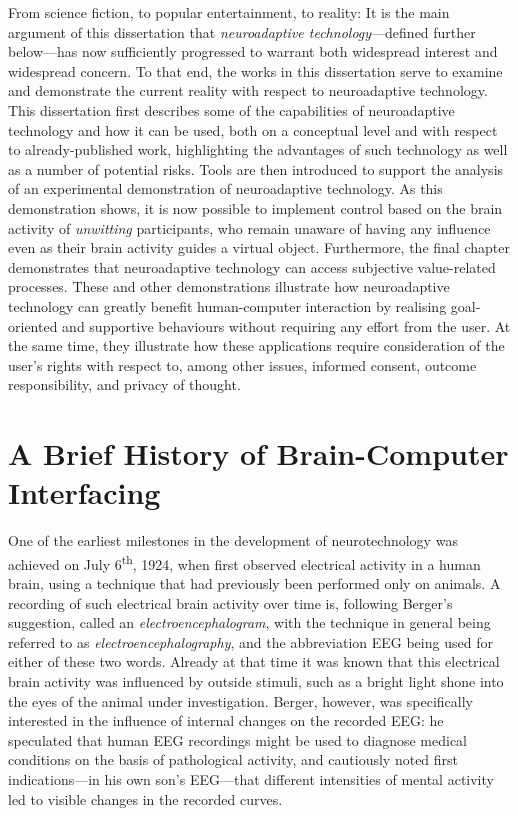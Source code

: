 From science fiction, to popular entertainment, to reality: It is the main argument of this dissertation that \emph{neuroadaptive technology}---defined further below---has now sufficiently progressed to warrant both widespread interest and widespread concern. To that end, the works in this dissertation serve to examine and demonstrate the current reality with respect to neuroadaptive technology. This dissertation first describes some of the capabilities of neuroadaptive technology and how it can be used, both on a conceptual level and with respect to already-published work, highlighting the advantages of such technology as well as a number of potential risks. Tools are then introduced to support the analysis of an experimental demonstration of neuroadaptive technology. As this demonstration shows, it is now possible to implement control based on the brain activity of \emph{unwitting} participants, who remain unaware of having any influence even as their brain activity guides a virtual object. Furthermore, the final chapter demonstrates that neuroadaptive technology can access subjective value-related processes. These and other demonstrations illustrate how neuroadaptive technology can greatly benefit human-computer interaction by realising goal-oriented and supportive behaviours without requiring any effort from the user. At the same time, they illustrate how these applications require consideration of the user's rights with respect to, among other issues, informed consent, outcome responsibility, and privacy of thought.


\clearpage%
%
\section*{A Brief History of Brain-Computer Interfacing}%

One of the earliest milestones in the development of neurotechnology was achieved on July 6\textsuperscript{th}, 1924, when  first observed electrical activity in a human brain, using a technique that had previously been performed only on animals. A recording of such electrical brain activity over time is, following Berger's suggestion, called an \emph{electroencephalogram}, with the technique in general being referred to as \emph{electroencephalography}, and the abbreviation EEG being used for either of these two words. Already at that time it was known that this electrical brain activity was influenced by outside stimuli, such as a bright light shone into the eyes of the animal under investigation. Berger, however, was specifically interested in the influence of internal changes on the recorded EEG: he speculated that human EEG recordings might be used to diagnose medical conditions on the basis of pathological activity, and cautiously noted first indications---in his own son's EEG---that different intensities of mental activity led to visible changes in the recorded curves.

